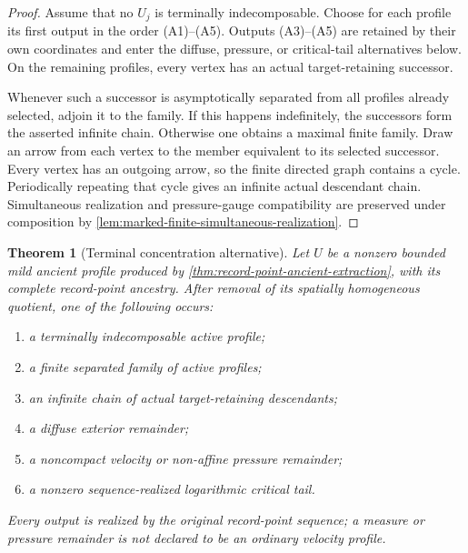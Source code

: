 \documentclass[11pt]{amsart}
\numberwithin{equation}{section}
\theoremstyle{plain}
\newtheorem{theorem}{Theorem}[section]
\theoremstyle{definition}
\theoremstyle{remark}
\begin{document}
\begin{proof}
Assume that no \(U_j\) is terminally indecomposable.  Choose for each profile
its first output in the order \textup{(A1)}--\textup{(A5)}.  Outputs
\textup{(A3)}--\textup{(A5)} are retained by their own coordinates and enter
the diffuse, pressure, or critical-tail alternatives below.  On the remaining
profiles, every vertex has an actual target-retaining successor.

Whenever such a successor is asymptotically separated from all profiles
already selected, adjoin it to the family.  If this happens indefinitely, the
successors form the asserted infinite chain.  Otherwise one obtains a maximal
finite family.  Draw an arrow from each vertex to the member equivalent to its
selected successor.  Every vertex has an outgoing arrow, so the finite
directed graph contains a cycle.  Periodically repeating that cycle gives an
infinite actual descendant chain.  Simultaneous realization and pressure-gauge
compatibility are preserved under composition by
\cref{lem:marked-finite-simultaneous-realization}.
\end{proof}

\begin{theorem}[Terminal concentration alternative]
\label{thm:terminal-concentration-alternative}
Let \(U\) be a nonzero bounded mild ancient profile produced by
\cref{thm:record-point-ancient-extraction}, with its complete record-point
ancestry.  After removal of its spatially homogeneous quotient, one of the
following occurs:
\begin{enumerate}[label=\textup{(T\arabic*)},leftmargin=2.8em]
\item a terminally indecomposable active profile;
\item a finite separated family of active profiles;
\item an infinite chain of actual target-retaining descendants;
\item a diffuse exterior remainder;
\item a noncompact velocity or non-affine pressure remainder;
\item a nonzero sequence-realized logarithmic critical tail.
\end{enumerate}
Every output is realized by the original record-point sequence; a measure or
pressure remainder is not declared to be an ordinary velocity profile.
\end{theorem}
\end{document}
